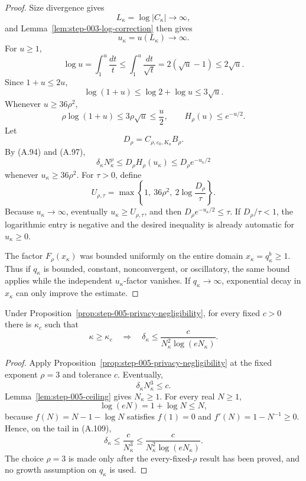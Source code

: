 \begin{proof}
Size divergence gives
\[
L_\kappa=\log|C_\kappa|\longrightarrow\infty,
\tag{A.102}
\]
and Lemma~\ref{lem:step-003-log-correction} then gives
\[
u_\kappa=u(L_\kappa)\longrightarrow\infty.
\tag{A.103}
\]
For \(u\geq1\),
\[
\log u
=\int_1^u\frac{dt}{t}
\leq\int_1^u\frac{dt}{\sqrt t}
=2(\sqrt u-1)
\leq2\sqrt u.
\]
Since \(1+u\leq2u\),
\[
\log(1+u)\leq\log2+\log u\leq3\sqrt u.
\tag{A.104}
\]
Whenever \(u\geq36\rho^2\),
\[
\rho\log(1+u)
\leq3\rho\sqrt u
\leq\frac{u}{2},
\qquad
H_\rho(u)\leq e^{-u/2}.
\tag{A.105}
\]
Let
\[
D_\rho=C_{\rho,\varepsilon_0,K_a}B_\rho.
\]
By (A.94) and (A.97),
\[
\delta_\kappa N_\kappa^\rho
\leq D_\rho H_\rho(u_\kappa)
\leq D_\rho e^{-u_\kappa/2}
\tag{A.106}
\]
whenever \(u_\kappa\geq36\rho^2\).
For \(\tau>0\), define
\[
U_{\rho,\tau}
=\max\left\{
1,\ 36\rho^2,\ 2\log\frac{D_\rho}{\tau}
\right\}.
\tag{A.107}
\]
Because \(u_\kappa\to\infty\), eventually
\(u_\kappa\geq U_{\rho,\tau}\), and then
\(D_\rho e^{-u_\kappa/2}\leq\tau\).  If
\(D_\rho/\tau<1\), the logarithmic entry is negative and the desired
inequality is already automatic for \(u_\kappa\geq0\).

The factor \(F_\rho(x_\kappa)\) was bounded uniformly on the entire
domain \(x_\kappa=q_\kappa^b\geq1\).  Thus if \(q_\kappa\) is bounded,
constant, nonconvergent, or oscillatory, the same bound applies while
the independent \(u_\kappa\)-factor vanishes.  If
\(q_\kappa\to\infty\), exponential decay in \(x_\kappa\) can only
improve the estimate.
\end{proof}

\begin{proposition}
\label{prop:step-005-source-allowance}
Under Proposition~\ref{prop:step-005-privacy-negligibility}, for every
fixed \(c>0\) there is \(\kappa_c\) such that
\[
\kappa\geq\kappa_c
\quad\Longrightarrow\quad
\delta_\kappa
\leq
\frac{c}{N_\kappa^2\log(eN_\kappa)}.
\tag{A.108}
\]
\end{proposition}

\begin{proof}
Apply Proposition~\ref{prop:step-005-privacy-negligibility} at the
fixed exponent \(\rho=3\) and tolerance \(c\).  Eventually,
\[
\delta_\kappa N_\kappa^3\leq c.
\tag{A.109}
\]
Lemma~\ref{lem:step-005-ceiling} gives \(N_\kappa\geq1\).  For every
real \(N\geq1\),
\[
\log(eN)=1+\log N\leq N,
\tag{A.110}
\]
because \(f(N)=N-1-\log N\) satisfies \(f(1)=0\) and
\(f'(N)=1-N^{-1}\geq0\).  Hence, on the tail in (A.109),
\[
\delta_\kappa
\leq\frac{c}{N_\kappa^3}
\leq\frac{c}{N_\kappa^2\log(eN_\kappa)}.
\]
The choice \(\rho=3\) is made only after the every-fixed-\(\rho\)
result has been proved, and no growth assumption on \(q_\kappa\) is
used.
\end{proof}

